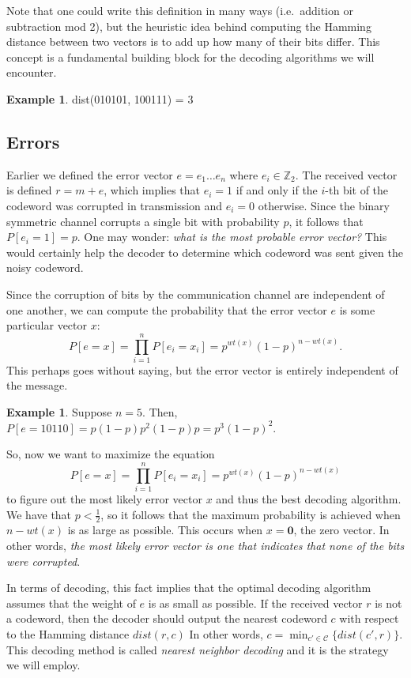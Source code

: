 \documentclass[12pt,twoside]{reedthesis}
\theoremstyle{definition}
\newtheorem{example}[theorem]{Example}
\newcommand{\Z}{\mathbb{Z}}
\begin{document}
Note that one could write this definition in many ways (i.e.~addition or subtraction mod 2), but the heuristic idea behind computing the Hamming distance between two vectors is to add up how many of their bits differ. This concept is a fundamental building block for the decoding algorithms we will encounter.

\begin{example}
dist(010101, 100111) = 3
\end{example}

\subsection{Errors}
Earlier we defined the error vector $e = e_1 \ldots e_n$ where $e_i \in \Z_2$. The received vector is defined $r = m + e$, which implies that $e_i = 1$ if and only if the $i$-th bit of the codeword was corrupted in transmission and $e_i = 0$ otherwise. Since the binary symmetric channel corrupts a single bit with probability $p$, it follows that $P[e_i = 1] = p$.  One may wonder: \textit{what is the most probable error vector?} This would certainly help the decoder to determine which codeword was sent given the noisy codeword.

Since the corruption of bits by the communication channel are independent of one another, we can compute the probability that the error vector $e$ is some particular vector $x$:
\begin{equation} \label{p_error_vect}
P[e = x] = \prod_{i = 1}^{n} P[e_i = x_i] = p^{wt(x)}(1-p)^{n-wt(x)}.
\end{equation}
This perhaps goes without saying, but the error vector is entirely independent of the message.
\begin{example}
Suppose $n=5$. Then, $P[e = 10110] = p(1-p)p^2 (1-p) p = p^3(1-p)^2$.
\end{example}
So, now we want to maximize the equation $$P[e = x] =  \prod_{i = 1}^{n} P[e_i = x_i] = p^{wt(x)}(1-p)^{n-wt(x)}$$ to figure out the most likely error vector $x$ and thus the best decoding algorithm. We have that $p < \frac{1}{2}$, so it follows that the maximum probability is achieved when $n-wt(x)$ is as large as possible. This occurs when $x = \mathbf{0}$, the zero vector. In other words, \textit{the most likely error vector is one that indicates that none of the bits were corrupted}.
 
 In terms of decoding, this fact implies that the optimal decoding algorithm assumes that the weight of $e$ is as small as possible. If the received vector $r$ is not a codeword, then the decoder should output the nearest codeword $c$ with respect to the Hamming distance $dist(r,c)$ In other words, $c = \min_{c' \in \mathscr{C}}\{dist(c', r)\}$. This decoding method is called \textit{nearest neighbor decoding} and it is the strategy we will employ.
\end{document}
